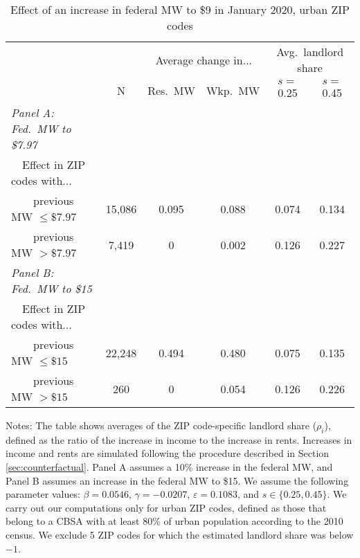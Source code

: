 \begin{table}[hbt!]
    \centering
    \caption{Effect of an increase in federal MW to \$9 in January 2020, urban ZIP codes}
    \label{tab:counterfactuals_other}

    \begin{tabular}{@{}lccccc@{}}
        \toprule
                            &   & \multicolumn{2}{c}{Average change in...}
                                & \multicolumn{2}{c}{Avg.\ landlord share}             \\ \cmidrule(lr){3-4} \cmidrule(l){5-6}
                            & N & Res.\ MW & Wkp.\ MW
                            & $s = $ 0.25  & $s = $ 0.45                                 \\ \midrule
        \textit{Panel A: Fed.\ MW to \$7.97}         &      &       &       &     &      \\
        $\quad $Effect in ZIP codes with...          &      &       &       &     &      \\
        $\quad \quad$previous MW $\leq\$7.97\quad$   & 15,086 &  0.095 & 0.088  & 0.074 &  0.134   \\
        $\quad \quad$previous MW $>\$7.97\quad$      & 7,419 &  0 & 0.002  & 0.126 & 0.227    \\[.3em]
        \textit{Panel B: Fed.\ MW to \$15}          &      &       &       &     &      \\
        $\quad $Effect in ZIP codes with...          &      &       &       &     &      \\
        $\quad \quad$previous MW $\leq\$15\quad$     & 22,248 &  0.494 & 0.480  & 0.075 &  0.135   \\
        $\quad \quad$previous MW $>\$15\quad$        & 260 &  0 & 0.054  & 0.126 & 0.226    \\ \bottomrule
    \end{tabular}
    
    \begin{minipage}{.95\textwidth} \footnotesize
        \vspace{2mm}
        Notes: 
        The table shows averages of the ZIP code-specific landlord share ($\rho_i$),
        defined as the ratio of the increase in income to the increase in rents.
        Increases in income and rents are simulated following the procedure
        described in Section \ref{sec:counterfactual}. 
        Panel A assumes a 10\% increase in the federal MW, and
        Panel B assumes an increase in the federal MW to \$15.
        We assume the following parameter values:
        $\beta = 0.0546$, $\gamma = -0.0207$, $\varepsilon = 0.1083$, and 
        $s\in\{0.25, 0.45\}$.
        We carry out our computations only for urban ZIP codes, defined as 
        those that belong to a CBSA with at least 80\% of urban population
        according to the 2010 census.
        We exclude 5 ZIP codes for which the estimated landlord share was 
        below $-1$.
    \end{minipage}
\end{table}